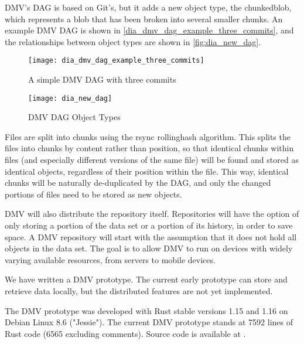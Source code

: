 %

\gls{DMV}'s \gls{DAG} is based on Git's, but it adds a new object type, the \gls{chunkedblob}, which represents a \gls{blob} that has been broken into several smaller chunks.
An example \gls{DMV} \gls{DAG} is shown in \autoref{dia_dmv_dag_example_three_commits}, and the relationships between object types are shown in \autoref{fig:dia_new_dag}.


\begin{figure}[]
    \centering

    \begin{minipage}{.65\textwidth}
        \texttt{[image: dia\_dmv\_dag\_example\_three\_commits]}
        \caption{A simple DMV DAG with three commits}
        \label{dia_dmv_dag_example_three_commits}
    \end{minipage}%
    \begin{minipage}{.35\textwidth}
        \texttt{[image: dia\_new\_dag]}
        \caption{DMV DAG Object Types}
        \label{fig:dia_new_dag}
    \end{minipage}
\end{figure}


Files are split into chunks using the rsync \gls{rollinghash} algorithm.
This splits the files into chunks by content rather than position, so that identical chunks within files (and especially different versions of the same file) will be found and stored as identical objects, regardless of their position within the file.
This way, identical chunks will be naturally de-duplicated by the \gls{DAG}, and only the changed portions of files need to be stored as new objects.

DMV will also distribute the repository itself.
Repositories will have the option of only storing a portion of the data set or a portion of its history, in order to save space.
A DMV repository will start with the assumption that it does not hold all objects in the data set.
The goal is to allow DMV to run on devices with widely varying available resources, from servers to mobile devices.

We have written a \gls{DMV} prototype.
The current early prototype can store and retrieve data locally, but the distributed features are not yet implemented.

The \gls{DMV} prototype was developed with Rust stable versions 1.15 and 1.16 on Debian Linux 8.6 ("Jessie").
The current DMV prototype stands at \num{7592} lines of Rust code (\num{6565} excluding comments).
Source code is available at \dmvurl .

